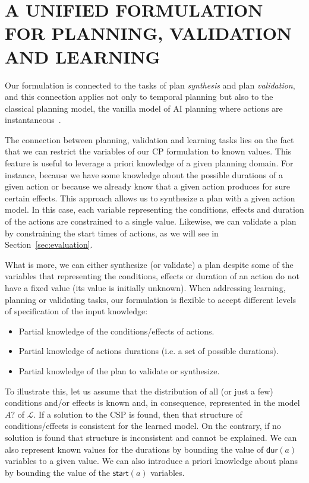 \documentclass{ecai}
\newcommand{\dur}{\mathsf{dur}}    %
\newcommand{\start}{\mathsf{start}}%
\begin{document}
\section{A UNIFIED FORMULATION FOR PLANNING, VALIDATION AND LEARNING}
\label{sec:usingCPValidation}


Our formulation is connected to the tasks of plan {\em synthesis} and plan {\em validation}, and this connection applies not only to temporal planning but also to the classical planning model, the vanilla model of AI planning where actions are instantaneous~\cite{geffner2013concise}. 

The connection between planning, validation and learning tasks lies on the fact that we can restrict the variables of our CP formulation to known values. This feature is useful to leverage a priori knowledge of a given planning domain. For instance, because we have some knowledge about the possible durations of a given action or because we already know that a given action produces for sure certain effects. This approach allows us to synthesize a plan with a given action model. In this case, each variable representing the conditions, effects and duration of the actions are constrained to a single value. Likewise, we can validate a plan by constraining the start times of actions, as we will see in Section~\ref{sec:evaluation}.

What is more, we can either synthesize (or validate) a plan despite some of the variables that representing the conditions, effects or duration of an action do not have a fixed value (its value is initially unknown). When addressing learning, planning or validating tasks, our formulation is flexible to accept different levels of specification of the input knowledge:

\begin{itemize}
\item Partial knowledge of the conditions/effects of actions.
\item Partial knowledge of actions durations (i.e. a set of possible durations).
\item Partial knowledge of the plan to validate or synthesize.
\end{itemize}

To illustrate this, let us assume that the distribution of all (or just a few) conditions and/or effects is known and, in consequence, represented in the model $A?$ of $\mathcal{L}$. If a solution to the CSP is found, then that structure of conditions/effects is consistent for the learned model. On the contrary, if no solution is found that structure is inconsistent and cannot be explained. We can also represent known values for the durations by bounding the value of $\dur(a)$ variables to a given value. We can also introduce a priori knowledge about plans by bounding the value of the $\start(a)$ variables.
\end{document}
